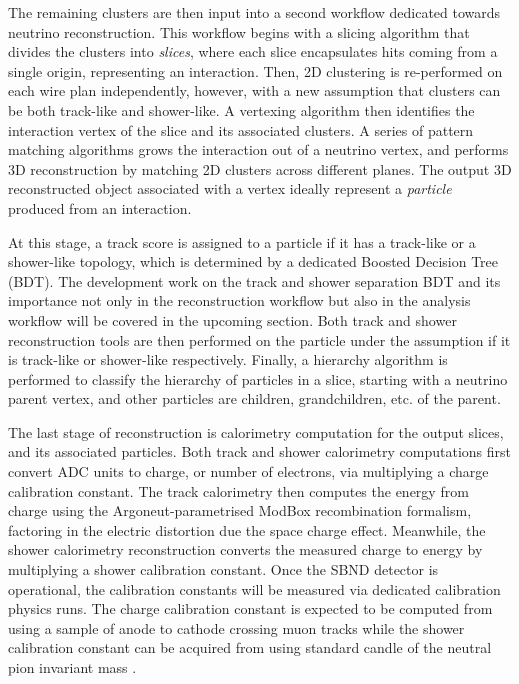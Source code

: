 The remaining clusters are then input into a second workflow dedicated towards neutrino reconstruction.
This workflow begins with a slicing algorithm that divides the clusters into \textit{slices}, where each slice encapsulates hits coming from a single origin, representing an interaction.
Then, 2D clustering is re-performed on each wire plan independently, however, with a new assumption that clusters can be both track-like and shower-like.
A vertexing algorithm then identifies the interaction vertex of the slice and its associated clusters.
A series of pattern matching algorithms grows the interaction out of a neutrino vertex, and performs 3D reconstruction by matching 2D clusters across different planes.
The output 3D reconstructed object associated with a vertex ideally represent a \textit{particle} produced from an interaction.

At this stage, a track score is assigned to a particle if it has a track-like or a shower-like topology, which is determined by a dedicated Boosted Decision Tree (BDT).
The development work on the track and shower separation BDT and its importance not only in the reconstruction workflow but also in the analysis workflow will be covered in the upcoming section.
Both track and shower reconstruction tools are then performed on the particle under the assumption if it is track-like or shower-like respectively. 
Finally, a hierarchy algorithm is performed to classify the hierarchy of particles in a slice, starting with a neutrino parent vertex, and other particles are children, grandchildren, etc. of the parent.

The last stage of reconstruction is calorimetry computation for the output slices, and its associated particles.
Both track and shower calorimetry computations first convert ADC units to charge, or number of electrons, via multiplying a charge calibration constant.
The track calorimetry then computes the energy from charge using the Argoneut-parametrised ModBox recombination formalism, factoring in the electric distortion due the space charge effect.
Meanwhile, the shower calorimetry reconstruction converts the measured charge to energy by multiplying a shower calibration constant.
Once the SBND detector is operational, the calibration constants will be measured via dedicated calibration physics runs.
The charge calibration constant is expected to be computed from using a sample of anode to cathode crossing muon tracks while the shower calibration constant can be acquired from using standard candle of the neutral pion invariant mass \cite{}.

